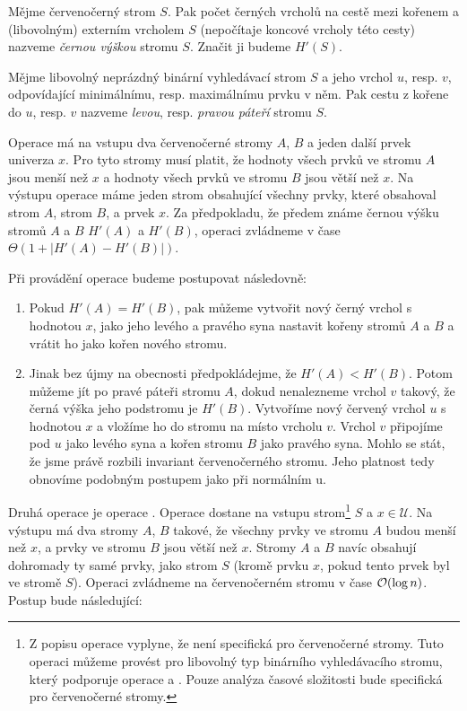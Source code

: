 \begin{definice}
Mějme červenočerný strom $S$. Pak počet černých vrcholů na cestě mezi kořenem a (libovolným) externím vrcholem $S$ (nepočítaje koncové vrcholy této cesty) nazveme \emph{černou výškou} stromu $S$. Značit ji budeme $H'(S)$.
\end{definice}


\begin{definice}
Mějme libovolný neprázdný binární vyhledávací strom $S$ a jeho vrchol $u$, resp. $v$, odpovídající minimálnímu, resp. maximálnímu prvku v něm. Pak cestu z kořene do $u$, resp. $v$ nazveme \emph{levou}, resp. \emph{pravou páteří} stromu $S$.
\end{definice}

Operace  má na vstupu dva červenočerné
stromy $A$, $B$ a jeden další prvek univerza $x$. Pro tyto stromy musí platit,
že hodnoty všech prvků ve stromu $A$ jsou menší než $x$ a hodnoty všech prvků
ve stromu $B$ jsou větší než $x$. Na výstupu operace  máme jeden strom
obsahující všechny prvky, které obsahoval strom $A$, strom $B$, a prvek $x$. Za
předpokladu, že předem známe černou výšku stromů $A$
a $B$ $H'(A)$ a $H'(B)$, operaci  zvládneme v čase $\Theta(1+|H'(A) -
H'(B)|)$.

Při provádění operace  budeme postupovat následovně:

\begin{enumerate}
\item Pokud $H'(A) = H'(B)$, pak můžeme vytvořit nový černý vrchol s hodnotou $x$, jako jeho levého a pravého syna nastavit kořeny stromů $A$ a $B$ a vrátit ho jako kořen nového stromu.
\item Jinak bez újmy na obecnosti předpokládejme, že $H'(A)<H'(B)$. Potom můžeme jít po pravé páteři stromu $A$, dokud nenalezneme vrchol $v$ takový, že černá výška jeho podstromu je $H'(B)$. Vytvoříme nový červený vrchol $u$ s hodnotou $x$ a vložíme ho do stromu na místo vrcholu $v$. Vrchol $v$ připojíme pod $u$ jako levého syna a kořen stromu $B$ jako pravého syna. Mohlo se stát, že jsme právě rozbili invariant červenočerného stromu. Jeho platnost tedy obnovíme podobným postupem jako při normálním u.
\end{enumerate}

Druhá operace je operace . Operace  dostane na vstupu strom\footnote{Z popisu operace  vyplyne, že není specifická pro červenočerné stromy. Tuto operaci můžeme provést pro libovolný typ binárního vyhledávacího stromu, který podporuje operace  a . Pouze analýza časové složitosti bude specifická pro červenočerné stromy.} $S$ a $x\in \mathcal U$. Na výstupu má dva stromy $A$, $B$ takové, že všechny prvky ve stromu $A$ budou menší než $x$, a prvky ve stromu $B$ jsou větší než $x$. Stromy $A$ a $B$ navíc obsahují dohromady ty samé prvky, jako strom $S$ (kromě prvku $x$, pokud tento prvek byl ve stromě $S$). Operaci  zvládneme na červenočerném stromu v čase $\mathcal O(\log n)$. Postup bude následující:

